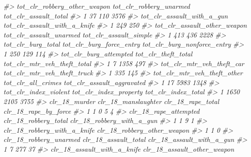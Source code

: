 \documentclass[
  12pt,
]{book}
\newenvironment{Shaded}{\begin{snugshade}}{\end{snugshade}}
\newcommand{\CommentTok}[1]{\textcolor[rgb]{0.37,0.37,0.37}{\textit{#1}}}
\begin{document}
\begin{Shaded}
\begin{Highlighting}[]
\CommentTok{\#\textgreater{}   tot\_clr\_robbery\_other\_weapon tot\_clr\_robbery\_unarmed tot\_clr\_assault\_total}
\CommentTok{\#\textgreater{} 1                           37                     110                  3576}
\CommentTok{\#\textgreater{}   tot\_clr\_assault\_with\_a\_gun tot\_clr\_assault\_with\_a\_knife}
\CommentTok{\#\textgreater{} 1                        249                          250}
\CommentTok{\#\textgreater{}   tot\_clr\_assault\_other\_weapon tot\_clr\_assault\_unarmed tot\_clr\_assault\_simple}
\CommentTok{\#\textgreater{} 1                          413                     436                   2228}
\CommentTok{\#\textgreater{}   tot\_clr\_burg\_total tot\_clr\_burg\_force\_entry tot\_clr\_burg\_nonforce\_entry}
\CommentTok{\#\textgreater{} 1                250                      129                         114}
\CommentTok{\#\textgreater{}   tot\_clr\_burg\_attempted tot\_clr\_theft\_total tot\_clr\_mtr\_veh\_theft\_total}
\CommentTok{\#\textgreater{} 1                      7                1358                         497}
\CommentTok{\#\textgreater{}   tot\_clr\_mtr\_veh\_theft\_car tot\_clr\_mtr\_veh\_theft\_truck}
\CommentTok{\#\textgreater{} 1                       335                         145}
\CommentTok{\#\textgreater{}   tot\_clr\_mtr\_veh\_theft\_other tot\_clr\_all\_crimes tot\_clr\_assault\_aggravated}
\CommentTok{\#\textgreater{} 1                          17               5983                       1348}
\CommentTok{\#\textgreater{}   tot\_clr\_index\_violent tot\_clr\_index\_property tot\_clr\_index\_total}
\CommentTok{\#\textgreater{} 1                  1650                   2105                3755}
\CommentTok{\#\textgreater{}   clr\_18\_murder clr\_18\_manslaughter clr\_18\_rape\_total clr\_18\_rape\_by\_force}
\CommentTok{\#\textgreater{} 1             1                   0                 5                    4}
\CommentTok{\#\textgreater{}   clr\_18\_rape\_attempted clr\_18\_robbery\_total clr\_18\_robbery\_with\_a\_gun}
\CommentTok{\#\textgreater{} 1                     1                    9                         1}
\CommentTok{\#\textgreater{}   clr\_18\_robbery\_with\_a\_knife clr\_18\_robbery\_other\_weapon}
\CommentTok{\#\textgreater{} 1                           1                           0}
\CommentTok{\#\textgreater{}   clr\_18\_robbery\_unarmed clr\_18\_assault\_total clr\_18\_assault\_with\_a\_gun}
\CommentTok{\#\textgreater{} 1                      7                  277                        37}
\CommentTok{\#\textgreater{}   clr\_18\_assault\_with\_a\_knife clr\_18\_assault\_other\_weapon}

\end{Highlighting}
\end{Shaded}
\end{document}
